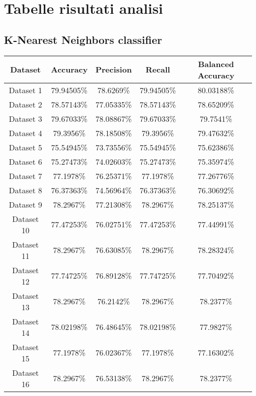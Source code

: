 \chapter{Tabelle risultati analisi}

\newpage

\section{K-Nearest Neighbors classifier}
\begin{center}
\begin{tabular}{ |c||c|c|c|c| } 
    \hline
    Dataset & Accuracy & Precision & Recall & Balanced Accuracy\\ 
    \hline\hline
    Dataset 1 & 79.94505\% & 78.6269\% & 79.94505\% & 80.03188\%\\
    \hline
    Dataset 2 & 78.57143\% & 77.05335\% & 78.57143\% & 78.65209\%\\
    \hline
    Dataset 3 & 79.67033\% & 78.08867\% & 79.67033\% & 79.7541\%\\
    \hline
    Dataset 4 & 79.3956\% & 78.18508\% & 79.3956\% & 79.47632\%\\
    \hline
    Dataset 5 & 75.54945\% & 73.73556\% & 75.54945\% & 75.62386\%\\
    \hline
    Dataset 6 & 75.27473\% & 74.02603\% & 75.27473\% & 75.35974\%\\
    \hline
    Dataset 7 & 77.1978\% & 76.25371\% & 77.1978\% & 77.26776\%\\
    \hline
    Dataset 8 & 76.37363\% & 74.56964\% & 76.37363\% & 76.30692\%\\
    \hline
    Dataset 9 & 78.2967\% & 77.21308\% & 78.2967\% & 78.25137\%\\
    \hline
    Dataset 10 & 77.47253\% & 76.02751\% & 77.47253\% & 77.44991\%\\
    \hline
    Dataset 11 & 78.2967\% & 76.63085\% & 78.2967\% & 78.28324\%\\
    \hline
    Dataset 12 & 77.74725\% & 76.89128\% & 77.74725\% & 77.70492\%\\
    \hline
    Dataset 13 & 78.2967\% & 76.2142\% & 78.2967\% & 78.2377\%\\
    \hline
    Dataset 14 & 78.02198\% & 76.48645\% & 78.02198\% & 77.9827\%\\
    \hline
    Dataset 15 & 77.1978\% & 76.02367\% & 77.1978\% & 77.16302\%\\
    \hline
    Dataset 16 & 78.2967\% & 76.53138\% & 78.2967\% & 78.2377\%\\

\end{tabular}
\end{center}
